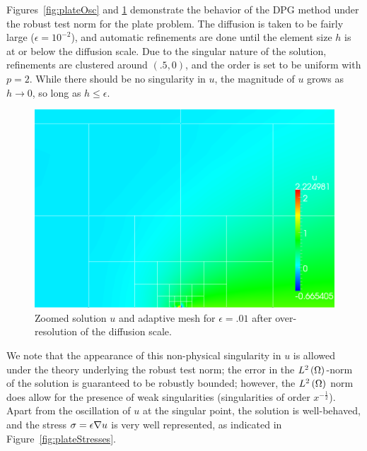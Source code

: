 Figures~\ref{fig:plateOsc} and \ref{fig:plateOscZoom} demonstrate the behavior of the DPG method under the robust test norm for the plate problem.  The diffusion is taken to be fairly large ($\epsilon = 10^{-2}$), and automatic refinements are done until the element size $h$ is at or below the diffusion scale.  Due to the singular nature of the solution, refinements are clustered around $(.5,0)$, and the order is set to be uniform with $p=2$.  While there should be no singularity in $u$, the magnitude of $u$ grows as $h \rightarrow 0$, so long as $h\leq \epsilon$.  

\begin{figure}[!h]
\centering
\includegraphics[scale=.375]{figs/LaplaceFigs/confusion1e2h1e3uZoom.png}
\caption{Zoomed solution $u$ and adaptive mesh for $\epsilon = .01$ after over-resolution of the diffusion scale. }
\label{fig:plateOscZoom}
\end{figure}

We note that the appearance of this non-physical singularity in $u$ is allowed under the theory underlying the robust test norm; the error in the $\L$-norm of the solution is guaranteed to be robustly bounded; however, the $\L$ norm does allow for the presence of weak singularities (singularities of order $x^{-\frac{1}{2}}$).  Apart from the oscillation of $u$ at the singular point, the solution is well-behaved, and the stress $\sigma = \epsilon \Grad u$ is very well represented, as indicated in Figure~\ref{fig:plateStresses}.  

